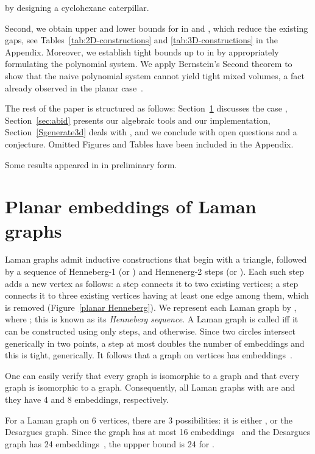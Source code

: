 \documentclass[envcountsame]{llncs}
\begin{document}
by designing a cyclohexane caterpillar.


Second, we obtain upper and lower  bounds for  in    and , which  reduce the existing gaps, 
see Tables~\ref{tab:2D-constructions} and \ref{tab:3D-constructions} in the Appendix.
Moreover, we establish tight bounds up to  in  by
appropriately formulating the polynomial system.
We apply Bernstein's Second theorem to show that the naive polynomial
system cannot yield tight mixed volumes,
a fact already observed in the planar case~\cite{ST08}.



The rest of the paper is structured as follows: 
Section~\ref{sec:laman-2d} discusses the case ,
Section~\ref{sec:abid} presents our algebraic tools and our implementation,
Section~\ref{Sgenerate3d} deals with , and we conclude with open questions
and a conjecture.
Omitted Figures and Tables have been  included  in the Appendix.


Some results appeared in \cite{EV09} in preliminary form.



\section{Planar embeddings of Laman graphs} \label{sec:laman-2d} 



 Laman graphs admit inductive constructions  that begin with  a triangle, followed by a sequence of Henneberg-1 (or ) and Hennenerg-2 steps (or ).  Each such step adds a new  vertex as follows:
a  step  connects it to two existing vertices;
a  step  connects it to three existing vertices having
at least one edge among them, which is removed (Figure~\ref{planar Henneberg}).
We represent each Laman graph by , where ; this is known as
 its {\em Henneberg sequence}.
A Laman graph  is called   iff it can be constructed using only  steps, and
  otherwise.
Since two circles intersect generically in two points, a  step  at most doubles
the number of embeddings and this is tight, generically. It follows that a   graph on  vertices has   embeddings~\cite{BS04}.


One can easily verify that every  graph is isomorphic to a  graph and that 
every  graph is isomorphic to a  graph. Consequently, all Laman graphs with   are  and they have 4 and 8 embeddings, respectively.   

For a Laman graph on 6 vertices, there are 3 possibilities: it is either ,    or the Desargues graph. Since the  graph  has at most 16 embeddings~\cite{W77,WH07} and  the Desargues graph has 24 embeddings~\cite{BS04}, the uppper bound is 24  for .
\end{document}
